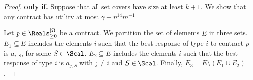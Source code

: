 \begin{proof}
%	
%	
%	
%	
%	
%	
	\textbf{only if.}
	Suppose that all set covers have size at least $k+1$.
	We show that any contract has utility at most $\gamma-n^{14}m^{-1}$.
	
	Let $p\in\Reals^{|\Omega|}_{\ge 0}$ be a contract.
	We partition the set of elements $E$ in three sets.
	$E_1\subseteq E$ includes the elements $i$ such that the best response of type $i$ to contract $p$ is $a_{i,S}$, for some $S \in \Scal$.
	$E_2\subseteq E$ includes  the elements $i$ such that the best response of type $i$ is $a_{j,S}$ with $j\neq i$ and $S \in \Scal$.
	Finally, $E_3=E \setminus (E_1\cup E_2)$.
	

\end{proof}
